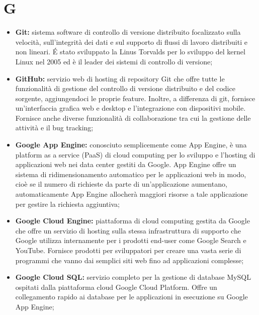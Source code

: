 \section*{G} %
\label{sec:g}
	\begin{itemize}
		\item \textbf{Git:} sistema software di controllo di versione distribuito focalizzato sulla velocità, sull'integrità dei dati e sul supporto di flussi di lavoro distribuiti e non lineari. É stato sviluppato la Linus Torvalds per lo sviluppo del kernel Linux nel 2005 ed è il leader dei sistemi di controllo di versione;
		\item \textbf{GitHub:} servizio web di hosting di repository Git che offre tutte le funzionalità di gestione del controllo di versione distribuito e del codice sorgente, aggiungendoci le proprie feature. Inoltre, a differenza di git, fornisce un'interfaccia grafica web e desktop e l'integrazione con dispositivi mobile. Fornisce anche diverse funzionalità di collaborazione tra cui la gestione delle attività e il bug tracking;
		\item \textbf{Google App Engine:} conosciuto semplicemente come App Engine, è una platform as a service (PaaS) di cloud computing per lo sviluppo e l'hosting di applicazioni web nei data center gestiti da Google. App Engine offre un sistema di ridimensionamento automatico per le applicazioni web in modo, cioè se il numero di richieste da parte di un'applicazione aumentano, automaticamente App Engine allocherà maggiori risorse a tale applicazione per gestire la richiesta aggiuntiva;
		\item \textbf{Google Cloud Engine:} piattaforma di cloud computing gestita da Google che offre un servizio di hosting sulla stessa infrastruttura di supporto che Google utilizza internamente per i prodotti end-user come Google Search e YouTube. Fornisce prodotti per sviluppatori per creare una vasta serie di programmi che vanno dai semplici siti web fino ad applicazioni complesse;
		\item \textbf{Google Cloud SQL:} servizio completo per la gestione di database MySQL ospitati dalla piattaforma cloud Google Cloud Platform. Offre un collegamento rapido ai database per le applicazioni in esecuzione su Google App Engine;
	\end{itemize}
\pagebreak

